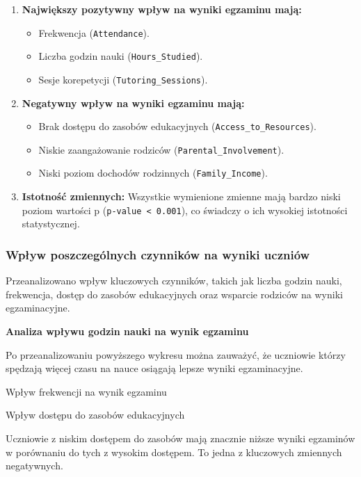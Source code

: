 \documentclass[
]{article}
\begin{document}
\begin{enumerate}
\def\labelenumi{\arabic{enumi}.}
\item
  \textbf{Największy pozytywny wpływ na wyniki egzaminu mają:}

  \begin{itemize}
  \item
    Frekwencja (\texttt{Attendance}).
  \item
    Liczba godzin nauki (\texttt{Hours\_Studied}).
  \item
    Sesje korepetycji (\texttt{Tutoring\_Sessions}).
  \end{itemize}
\item
  \textbf{Negatywny wpływ na wyniki egzaminu mają:}

  \begin{itemize}
  \item
    Brak dostępu do zasobów edukacyjnych
    (\texttt{Access\_to\_Resources}).
  \item
    Niskie zaangażowanie rodziców (\texttt{Parental\_Involvement}).
  \item
    Niski poziom dochodów rodzinnych (\texttt{Family\_Income}).
  \end{itemize}
\item
  \textbf{Istotność zmiennych:} Wszystkie wymienione zmienne mają bardzo
  niski poziom wartości p (\texttt{p-value\ \textless{}\ 0.001}), co
  świadczy o ich wysokiej istotności statystycznej.
\end{enumerate}

\subsubsection{Wpływ poszczególnych czynników na wyniki
uczniów}\label{wpux142yw-poszczeguxf3lnych-czynnikuxf3w-na-wyniki-uczniuxf3w}

Przeanalizowano wpływ kluczowych czynników, takich jak liczba godzin
nauki, frekwencja, dostęp do zasobów edukacyjnych oraz wsparcie rodziców
na wyniki egzaminacyjne.

\textbf{Analiza wpływu godzin nauki na wynik egzaminu}

Po przeanalizowaniu powyższego wykresu można zauważyć, że uczniowie
którzy spędzają więcej czasu na nauce osiągają lepsze wyniki
egzaminacyjne.

Wpływ frekwencji na wynik egzaminu

Wpływ dostępu do zasobów edukacyjnych

Uczniowie z niskim dostępem do zasobów mają znacznie niższe wyniki
egzaminów w porównaniu do tych z wysokim dostępem. To jedna z kluczowych
zmiennych negatywnych.
\end{document}
